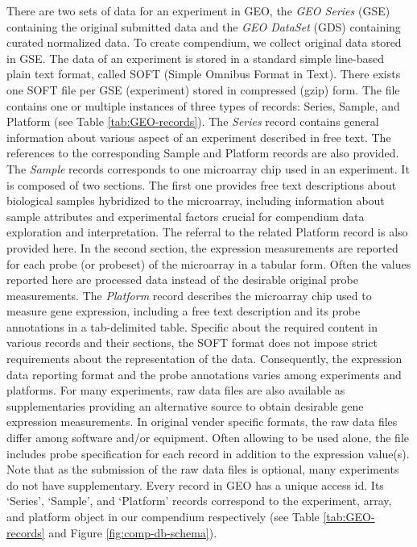 %
There are two sets of data for an experiment in GEO, the \textit{GEO Series}
(GSE) containing the original submitted data and the \textit{GEO DataSet} (GDS)
containing curated normalized data.
%
To create compendium, we collect original data stored in GSE. The data of an
experiment is stored in a standard simple line-based plain text format,
called SOFT (Simple Omnibus Format in Text).  There exists one SOFT file per
GSE (experiment) stored in compressed (gzip) form.
%
The file contains one or multiple instances of three types of records:
Series, Sample, and Platform (see Table \ref{tab:GEO-records}).
%
The \textit{Series} record contains general information about various
aspect of an experiment described in free text.  The references to the
corresponding Sample and Platform records are also provided.
%
The \textit{Sample} records corresponds to one microarray chip used in an
experiment.
%
It is composed of two sections.  The first one provides free text descriptions
about biological samples hybridized to the microarray, including information
about sample attributes and experimental factors crucial for compendium data
exploration and interpretation.
%
The referral to the related Platform record is also provided here.
%
In the second section, the expression measurements are reported for each probe
(or probeset) of the microarray in a tabular form. Often the values reported
here are processed data instead of the desirable original probe measurements.
%
The \textit{Platform} record describes the microarray chip used to measure
gene expression, including a free text description and its probe annotations
in a tab-delimited table.
%
Specific about the required content in various records and their sections, the
SOFT format does not impose strict requirements about the representation of the
data.
%
Consequently, the expression data reporting format and the probe annotations
varies among experiments and platforms.
%
For many experiments, raw data files are also available as supplementaries
providing an alternative source to obtain desirable gene expression
measurements.
%
In original vender specific formats, the raw data files differ among software
and/or equipment.  Often allowing to be used alone, the file includes probe
specification for each record in addition to the expression value(s).
%
Note that as the submission of the raw data files is optional, many experiments
do not have supplementary.
%
Every record in GEO has a unique access id.
%
Its `Series', `Sample', and `Platform' records correspond to the experiment,
array, and platform object in our compendium respectively (see Table
\ref{tab:GEO-records} and Figure \ref{fig:comp-db-schema}).


